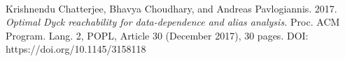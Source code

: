 \documentclass[12pt]{article}  %
\theoremstyle{definition}
\theoremstyle{remark}
\begin{document}
\
\begin{thebibliography}{9}

Krishnendu Chatterjee, Bhavya Choudhary, and Andreas Pavlogiannis. 
2017. 
\emph{Optimal Dyck reachability for data-dependence and alias analysis.}
Proc. ACM Program. Lang. 2, POPL, Article 30 (December 2017), 30 pages. DOI: 
https://doi.org/10.1145/3158118




\end{thebibliography}
\end{document}
